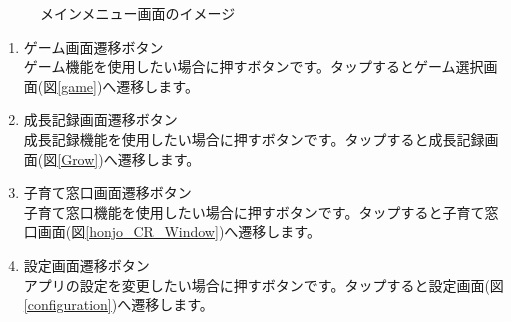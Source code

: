 \documentclass[a4j]{jarticle}
\begin{document}
\begin{figure}[H]
    \begin{center}
    \caption {メインメニュー画面のイメージ}
    \label{honjo_main}
    \end{center}
\end{figure}

\begin{enumerate}
  \renewcommand{\labelenumi}{\textcircled{\scriptsize \theenumi}}
  \item ゲーム画面遷移ボタン\\
        ゲーム機能を使用したい場合に押すボタンです。タップするとゲーム選択画面(図\ref{game})へ遷移します。
  \item 成長記録画面遷移ボタン\\
        成長記録機能を使用したい場合に押すボタンです。タップすると成長記録画面(図\ref{Grow})へ遷移します。
  \item 子育て窓口画面遷移ボタン\\
        子育て窓口機能を使用したい場合に押すボタンです。タップすると子育て窓口画面(図\ref{honjo_CR_Window})へ遷移します。
  \item 設定画面遷移ボタン\\
        アプリの設定を変更したい場合に押すボタンです。タップすると設定画面(図\ref{configuration})へ遷移します。
\end{enumerate}
\end{document}
